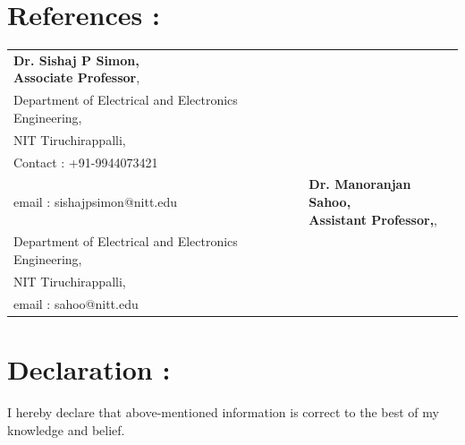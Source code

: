 \documentclass[a4paper, 12 pt]{article}
\begin{document}
\section*{References :}
\begin{table}[h]
\begin{tabular}{p{8 cm}|p{8cm}}
\centering {\bf Dr. Sishaj P Simon,\\Associate Professor},\\Department of Electrical and Electronics Engineering,\\ NIT Tiruchirappalli,\\ Contact : +91-9944073421\\email : sishajpsimon@nitt.edu &\centering  {\bf Dr. Manoranjan Sahoo,\\Assistant Professor,},\\Department of Electrical and Electronics Engineering,\\ NIT Tiruchirappalli,\\ email : sahoo@nitt.edu
\end{tabular}
\end{table}
\section*{Declaration :}
\hspace{1cm}I hereby declare that above-mentioned information is correct to the best of my \\
\hspace{1cm}knowledge and belief.
\end{document}
